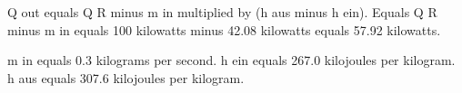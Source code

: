 Q out equals Q R minus m in multiplied by (h aus minus h ein).  
Equals Q R minus m in equals 100 kilowatts minus 42.08 kilowatts equals 57.92 kilowatts.  

m in equals 0.3 kilograms per second.  
h ein equals 267.0 kilojoules per kilogram.  
h aus equals 307.6 kilojoules per kilogram.